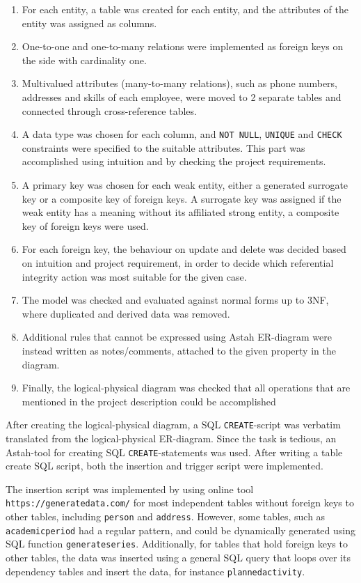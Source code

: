\documentclass[a4paper]{scrartcl}
\renewcommand{\_}{\textunderscore\allowbreak}
\begin{document}
\begin{enumerate}
  \item For each entity, a table was created for each entity, and the attributes of the entity was assigned as columns.
  \item One-to-one and one-to-many relations were implemented as foreign keys on the side with cardinality one.
  \item Multivalued attributes (many-to-many relations), such as phone numbers, addresses and skills of each employee, were moved to 2 separate tables and connected through cross-reference tables.
  \item A data type was chosen for each column, and \texttt{NOT NULL}, \texttt{UNIQUE} and \texttt{CHECK} constraints were specified to the suitable attributes. This part was accomplished using intuition and by checking the project requirements.
  \item A primary key was chosen for each weak entity, either a generated surrogate key or a composite key of foreign keys. A surrogate key was assigned if the weak entity has a meaning without its affiliated strong entity, a composite key of foreign keys were used. 
  \item For each foreign key, the behaviour on update and delete was decided based on intuition and project requirement, in order to decide which referential integrity action was most suitable for the given case.
  \item The model was checked and evaluated against normal forms up to 3NF, where duplicated and derived data was removed.
  \item Additional rules that cannot be expressed using Astah ER-diagram were instead written as notes/comments, attached to the given property in the diagram.
  \item Finally, the logical-physical diagram was checked that all operations that are mentioned in the project description could be accomplished
\end{enumerate}

After creating the logical-physical diagram, a SQL \texttt{CREATE}-script was verbatim translated from the logical-physical ER-diagram. Since the task is tedious, an Astah-tool for creating SQL \texttt{CREATE}-statements was used. After writing a table create SQL script, both the insertion and trigger script were implemented.

The insertion script was implemented by using online tool \texttt{https://generatedata.com/} for most independent tables without foreign keys to other tables, including \texttt{person} and \texttt{address}. However, some tables, such as \texttt{academic\_period} had a regular pattern, and could be dynamically generated using SQL function \texttt{generate\_series}. Additionally, for tables that hold foreign keys to other tables, the data was inserted using a general SQL query that loops over its dependency tables and insert the data, for instance \texttt{planned\_activity}.
\end{document}
